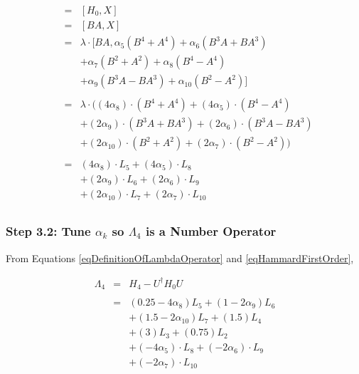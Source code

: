 \documentclass{article}
\begin{document}
\begin{eqnarray}
[-X,H_{0}] & = & [H_{0},X] \nonumber \\
           & = & [BA,X] \nonumber \\
           & = & {\lambda}{\cdot}[BA,\alpha_{5}(B^{4}+A^{4})+\alpha_{6}(B^{3}A+BA^{3}) \\
           &   &                     +\alpha_{7}(B^{2}+A^{2})+\alpha_{8}(B^{4}-A^{4}) \nonumber \\
           &   &                     +\alpha_{9}(B^{3}A-BA^{3})+\alpha_{10}(B^{2}-A^{2})] \nonumber \\
           &   & \nonumber \\
           & = & {\lambda}{\cdot}( (4\alpha_8){\cdot}(B^{4}+A^{4}) + (4\alpha_5){\cdot}(B^{4}-A^{4}) \\
           &   &  + (2\alpha_9){\cdot}(B^{3}A+BA^{3}) + (2\alpha_6){\cdot}(B^{3}A-BA^{3}) \nonumber \\
           &   &  + (2\alpha_{10}){\cdot}(B^{2}+A^{2}) + (2\alpha_7){\cdot}(B^{2}-A^{2})) \nonumber \\
           &   & \nonumber \\
           & = & (4\alpha_8){\cdot}L_{5} + (4\alpha_5){\cdot}L_{8} \\
           &   &  + (2\alpha_9){\cdot}L_{6} + (2\alpha_6){\cdot}L_{9} \nonumber \\
           &   &  + (2\alpha_{10}){\cdot}L_{7} + (2\alpha_7){\cdot}L_{10} \nonumber \\
           &   & \nonumber
\end{eqnarray}

\subsubsection{Step 3.2: Tune $\alpha_{k}$ so $\Lambda_{4}$ is a Number Operator}

From Equations \ref{eqDefinitionOfLambdaOperator} and \ref{eqHammardFirstOrder},

\begin{eqnarray}
\Lambda_{4} & = & H_{4} - U^{\dagger}H_{0}U \nonumber \\
            &   & \nonumber \\
            & = & (0.25-4\alpha_8)L_{5} + (1-2\alpha_9)L_{6} \\
            &   & + (1.5-2\alpha_{10})L_{7} + (1.5)L_{4} \nonumber \\
            &   & + (3)L_{3} + (0.75)L_{2} \nonumber \\
            &   & + (-4\alpha_5){\cdot}L_{8} + (-2\alpha_6){\cdot}L_{9} \nonumber \\
            &   & + (-2\alpha_7){\cdot}L_{10} \nonumber
\end{eqnarray}
\end{document}
